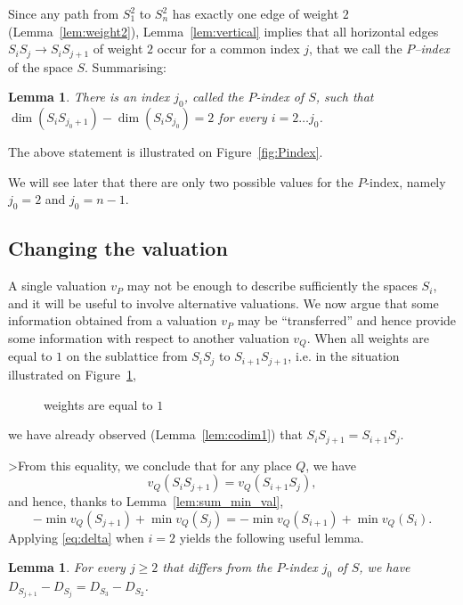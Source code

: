 \documentclass{article}
\theoremstyle{plain}
\newtheorem{lemma}[thm]{Lemma}
\theoremstyle{definition}
\theoremstyle{remark}
\renewcommand{\geq}{\geqslant}
\begin{document}
Since any path from $S_1^2$ to $S_n^2$ has exactly one edge of weight
$2$ (Lemma~\ref{lem:weight2}), Lemma~\ref{lem:vertical}
implies that all horizontal edges $S_iS_j \rightarrow S_iS_{j+1}$ of
weight $2$ occur for a common index $j$, that we call the {\em
  $P$--index} of the space $S$.
Summarising:

\begin{lemma}\label{lem:Pindex}
  There is an index $j_0$, called the {\em $P$-index} of $S$, such that
  $\dim(S_{i}S_{j_0+1})-\dim(S_iS_{j_0})=2$
  for every $i=2\ldots j_0$.
\end{lemma}

The above statement is illustrated on Figure~\ref{fig:Pindex}.



We will see later that there are only two possible values for the
$P$-index, namely $j_0=2$ and $j_0=n-1$.

\subsection{Changing the valuation}
\label{sec:changing}

A single valuation $v_P$ may not be enough to describe sufficiently the
spaces $S_i$, and it will be useful to involve alternative valuations.
We now argue that some information
obtained from a valuation $v_P$ may be ``transferred'' and hence provide 
some information with respect to another valuation $v_Q$.
When all weights are equal to $1$ on the sublattice from $S_iS_j$ to
$S_{i+1}S_{j+1}$, i.e. in the situation illustrated on Figure~\ref{fig:square},
\begin{figure}[h]
  \centering
  \caption{weights are equal to $1$}
  \label{fig:square}
\end{figure}
we have already observed (Lemma~\ref{lem:codim1}) that
$S_{i}S_{j+1}=S_{i+1}S_{j}$. 

>From this equality, we conclude that for any place $Q$,
we have 
$$v_Q(S_{i}S_{j+1})=v_Q(S_{i+1}S_{j}),$$ 
and hence,
thanks to Lemma~\ref{lem:sum_min_val},
\begin{equation}\label{eq:delta}
-\min v_Q(S_{j+1})+\min v_Q(S_j) =-\min v_Q(S_{i+1})+\min v_Q(S_i).
\end{equation}
Applying \eqref{eq:delta} when $i=2$ yields the following useful lemma.
\begin{lemma}\label{lem:D_Si}
For every $j\geq 2$ that differs from the $P$-index $j_0$ of $S$,
we have $D_{S_{j+1}}-D_{S_j}=D_{S_3}-D_{S_2}$.
\end{lemma}
\end{document}

